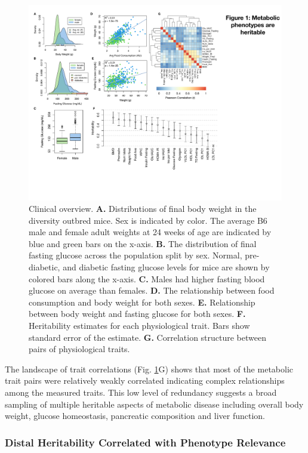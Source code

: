 \documentclass[
]{article}
\begin{document}
\begin{figure}[ht!]
\includegraphics[width=\textwidth]{Figures/Fig1_trait_overview.pdf} 
\caption{Clinical overview. \textbf{A.} Distributions of final body weight 
in the diversity outbred mice. Sex is indicated by color. The 
average B6 male and female adult weights at 24 weeks of age 
are indicated by blue and green bars on the x-axis. \textbf{B.} The 
distribution of final fasting glucose across the population split 
by sex. Normal, pre-diabetic, and diabetic fasting glucose levels 
for mice are shown by colored bars along the x-axis. \textbf{C.} Males had 
higher fasting blood glucose on average than females. \textbf{D.} The 
relationship between food consumption and body weight for both 
sexes. \textbf{E.} Relationship between body weight and fasting glucose 
for both sexes. \textbf{F.} Heritability estimates for each physiological 
trait. Bars show standard error of the estimate. \textbf{G.} Correlation 
structure between pairs of physiological traits.}
\label{fig:trait_overview}
\end{figure}

The landscape of trait correlations (Fig. \ref{fig:trait_overview}G)
shows that most of the metabolic trait pairs were relatively weakly
correlated indicating complex relationships among the measured traits.
This low level of redundancy suggests a broad sampling of multiple
heritable aspects of metabolic disease including overall body weight,
glucose homeostasis, pancreatic composition and liver function.

\subsubsection{Distal Heritability Correlated with Phenotype
Relevance}\label{distal-heritability-correlated-with-phenotype-relevance}
\end{document}
